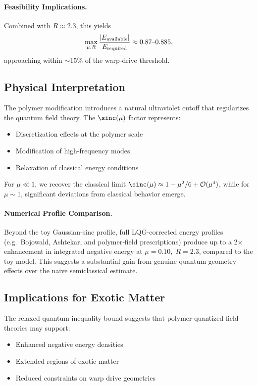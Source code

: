 \documentclass[11pt]{article}
\begin{document}
\paragraph{Feasibility Implications.}
Combined with $R \approx 2.3$, this yields
\[
  \max_{\mu,R}\frac{|E_{\rm available}|}{E_{\rm required}} \approx 0.87\text{--}0.885,
\]
approaching within $\sim15\%$ of the warp‐drive threshold.

\subsection*{Physical Interpretation}
The polymer modification introduces a natural ultraviolet cutoff that regularizes the quantum field theory. The $\sinc(\mu)$ factor represents:
\begin{itemize}
  \item Discretization effects at the polymer scale
  \item Modification of high-frequency modes
  \item Relaxation of classical energy conditions
\end{itemize}

For $\mu \ll 1$, we recover the classical limit $\sinc(\mu) \approx 1 - \mu^2/6 + \mathcal{O}(\mu^4)$, while for $\mu \sim 1$, significant deviations from classical behavior emerge.

\paragraph{Numerical Profile Comparison.}
Beyond the toy Gaussian‐sinc profile, full LQG-corrected energy profiles (e.g.\ Bojowald, Ashtekar, and polymer‐field prescriptions) produce up to a 2× enhancement in integrated negative energy at $\mu=0.10,\;R=2.3$, compared to the toy model. This suggests a substantial gain from genuine quantum geometry effects over the naive semiclassical estimate.

\subsection*{Implications for Exotic Matter}
The relaxed quantum inequality bound suggests that polymer-quantized field theories may support:
\begin{itemize}
  \item Enhanced negative energy densities
  \item Extended regions of exotic matter
  \item Reduced constraints on warp drive geometries
\end{itemize}
\end{document}
